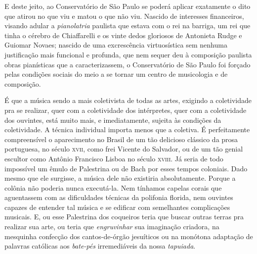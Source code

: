 E deste jeito, ao Conservatório de São Paulo se poderá aplicar
exatamente o dito que atirou no que viu e matou o que não viu. Nascido
de interesses financeiros, visando adular a \textit{pianolatria} paulista que
estava com o rei na barriga, um rei que tinha o cérebro de Chiaffarelli
e os vinte dedos gloriosos de Antonieta Rudge e Guiomar Novaes; nascido
de uma excrescência virtuosística sem nenhuma justificação mais
funcional e profunda, que nem sequer deu à composição paulista obras
pianísticas que a caracterizassem, o Conservatório de São Paulo foi
forçado pelas condições sociais do meio a se tornar um centro de
musicologia e de composição.

É que a música sendo a mais coletivista de todas as artes, exigindo a
coletividade pra se realizar, quer com a coletividade dos intérpretes,
quer com a coletividade dos ouvintes, está muito mais, e imediatamente,
sujeita às condições da coletividade. A técnica individual importa menos
que a coletiva. É perfeitamente compreensível o aparecimento no Brasil
de um tão delicioso clássico da prosa portuguesa, no século \textsc{xvii}, como
frei Vicente do Salvador, ou de um tão genial escultor como Antônio
Francisco Lisboa no século \textsc{xviii}. Já seria de todo impossível um êmulo
de Palestrina ou de Bach por esses tempos coloniais. Dado mesmo que ele
surgisse, a música dele não existiria absolutamente. Porque a colônia
não poderia nunca executá-la. Nem tínhamos capelas corais que
aguentassem com as dificuldades técnicas da polifonia florida, nem
ouvintes capazes de entender tal música e se edificar com semelhantes
complicações musicais. E, ou esse Palestrina dos coqueiros teria que
buscar outras terras pra realizar sua arte, ou teria que \textit{engruvinhar} sua
imaginação criadora, na mesquinha confecção dos cantos-de-órgão
jesuíticos ou na monótona adaptação de palavras católicas aos \textit{bate-pés}
irremediáveis da nossa \textit{tapuiada}.

